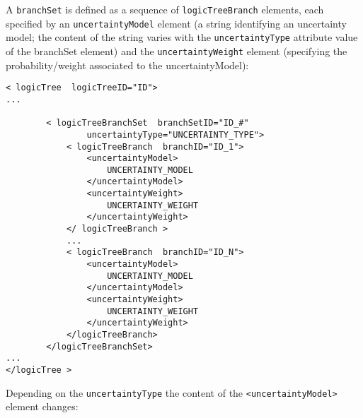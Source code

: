 A \Verb+branchSet+ is defined as a sequence of \Verb+logicTreeBranch+
elements, each specified by an \Verb+uncertaintyModel+ element (a string
identifying an uncertainty model; the content of the string varies with the \texttt{uncertaintyType} attribute value of the branchSet element) and the \texttt{uncertaintyWeight} element (specifying the probability/weight associated to the uncertaintyModel):

\begin{verbatim}
< logicTree  logicTreeID="ID">
...

		< logicTreeBranchSet  branchSetID="ID_#"
				uncertaintyType="UNCERTAINTY_TYPE">
			< logicTreeBranch  branchID="ID_1">
				<uncertaintyModel>
				    UNCERTAINTY_MODEL
				</uncertaintyModel>
				<uncertaintyWeight>
				    UNCERTAINTY_WEIGHT
				</uncertaintyWeight>
			</ logicTreeBranch >
			...
			< logicTreeBranch  branchID="ID_N">
				<uncertaintyModel>
				    UNCERTAINTY_MODEL
				</uncertaintyModel>
				<uncertaintyWeight>
				    UNCERTAINTY_WEIGHT
				</uncertaintyWeight>
			</logicTreeBranch>
		</logicTreeBranchSet>
...
</logicTree >
\end{verbatim}

Depending on the \Verb+uncertaintyType+ the content of the
\Verb+<uncertaintyModel>+ element changes:

